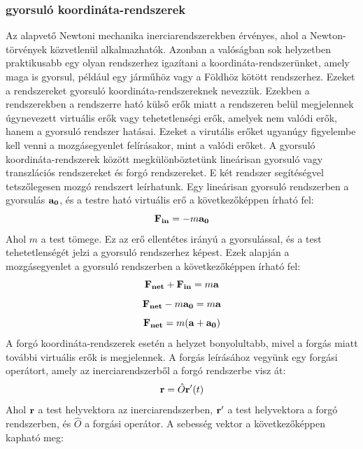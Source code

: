 \documentclass[a4paper,12pt]{article}
\begin{document}
\subsubsection{gyorsuló koordináta-rendszerek}
Az alapvető Newtoni mechanika inerciarendszerekben érvényes, ahol a Newton-törvények közvetlenül alkalmazhatók. Azonban a valóságban sok helyzetben praktikusabb egy olyan rendszerhez igazítani a koordináta-rendszerünket,
amely maga is gyorsul, például egy járműhöz vagy a Földhöz kötött rendszerhez. Ezeket a rendszereket gyorsuló koordináta-rendszereknek nevezzük. Ezekben a rendszerekben a rendszerre ható külső erők miatt a rendszeren belül
megjelennek úgynevezett virtuális erők vagy tehetetlenségi erők, amelyek nem valódi erők, hanem a gyorsuló rendszer hatásai. Ezeket a virutális erőket ugyanúgy figyelembe kell venni a mozgásegyenlet felírásakor, mint a valódi erőket.
A gyorsuló koordináta-rendszerek között megkülönböztetünk lineárisan gyorsuló vagy transzlációs rendszereket és forgó rendszereket. E két rendszer segítéségvel tetszőlegesen mozgó rendszert leírhatunk. Egy lineárisan gyorsuló rendszerben
a gyorsulás $\bold{a_0}$, és a testre ható virtuális erő a következőképpen írható fel:
\begin{equation}
    \bold{F_{in}} = -m\bold{a_0}
\end{equation}
Ahol $m$ a test tömege. Ez az erő ellentétes irányú a gyorsulással, és a test tehetetlenségét jelzi a gyorsuló rendszerhez képest. Ezek alapján a mozgásegyenlet a gyorsuló rendszerben a következőképpen írható fel:
\begin{equation}
    \bold{F_{net}} + \bold{F_{in}} = m\bold{a}
\end{equation}
\begin{equation}
    \bold{F_{net}} - m\bold{a_0} = m\bold{a}
\end{equation}
\begin{equation}
    \bold{F_{net}} = m(\bold{a} + \bold{a_0})
\end{equation}
A forgó koordináta-rendszerek esetén a helyzet bonyolultabb, mivel a forgás miatt további virtuális erők is megjelennek. A forgás leírásához vegyünk egy forgási operátort, amely az inerciarendszerből a forgó rendszerbe visz át:
\begin{equation}
    \bold{r} = \hat{O}\bold{r'}(t)
\end{equation}
Ahol $\bold{r}$ a test helyvektora az inerciarendszerben, $\bold{r'}$ a test helyvektora a forgó rendszerben, és $\hat{O}$ a forgási operátor. A sebesség vektor a következőképpen kapható meg:
\end{document}
